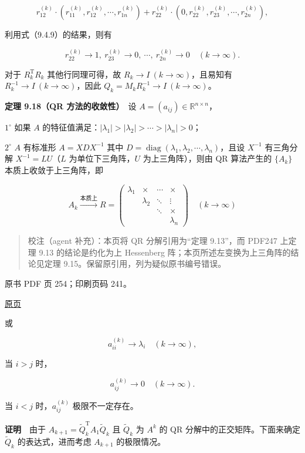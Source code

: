 \[
r_{12}^{(k)}\cdot(r_{11}^{(k)},r_{12}^{(k)},\cdots,r_{1n}^{(k)})
+r_{22}^{(k)}\cdot(0,r_{22}^{(k)},r_{23}^{(k)},\cdots,r_{2n}^{(k)}),
\]

利用式（9.4.9）的结果，则有

\[
r_{22}^{(k)}\to1,\ r_{23}^{(k)}\to0,\ \cdots,\ r_{2n}^{(k)}\to0\quad(k\to\infty).
\tag{9.4.10}
\]

对于 \(R_k^{\mathrm T}R_k\) 其他行同理可得，故 \(R_k\to I\ (k\to\infty)\)，且易知有 \(R_k^{-1}\to I\ (k\to\infty)\)，因此 \(Q_k=M_kR_k^{-1}\to I\ (k\to\infty)\)。

\textbf{定理 9.18（QR 方法的收敛性）}　设 \(A=(a_{ij})\in\mathbb R^{n\times n}\)，

\(1^\circ\) 如果 \(A\) 的特征值满足：\(|\lambda_1|>|\lambda_2|>\cdots>|\lambda_n|>0\)；

\(2^\circ\) \(A\) 有标准形 \(A=XDX^{-1}\) 其中 \(D=\operatorname{diag}(\lambda_1,\lambda_2,\cdots,\lambda_n)\)，且设 \(X^{-1}\) 有三角分解 \(X^{-1}=LU\)（\(L\) 为单位下三角阵，\(U\) 为上三角阵），则由 QR 算法产生的 \(\{A_k\}\) 本质上收敛于上三角阵，即

\[
A_k\xrightarrow{\text{本质上}}R=
\begin{pmatrix}
\lambda_1&\times&\cdots&\times\\
&\lambda_2&\ddots&\vdots\\
&&\ddots&\times\\
&&&\lambda_n
\end{pmatrix}\quad(k\to\infty)
\]

\begin{quote}
校注（agent 补充）：本页将 QR 分解引用为``定理 9.13''，而 PDF247 上定理 9.13 的结论是约化为上 Hessenberg 阵；本页所述左变换为上三角阵的结论见定理 9.15。保留原引用，列为疑似原书编号错误。
\end{quote}

\clearpage

原书 PDF 页 254；印刷页码 241。

\href{source-images/pdf-254.jpeg}{原页}

或

\[
a_{ii}^{(k)}\to\lambda_i\quad(k\to\infty),
\tag{9.4.11}
\]

当 \(i>j\) 时，

\[
a_{ij}^{(k)}\to0\quad(k\to\infty).
\tag{9.4.12}
\]

当 \(i<j\) 时，\(a_{ij}^{(k)}\) 极限不一定存在。

\textbf{证明}　由于 \(A_{k+1}=\widetilde Q_k^{\mathrm T}A_1\widetilde Q_k\) 且 \(\widetilde Q_k\) 为 \(A^k\) 的 QR 分解中的正交矩阵。下面来确定 \(\widetilde Q_k\) 的表达式，进而考虑 \(A_{k+1}\) 的极限情况。

